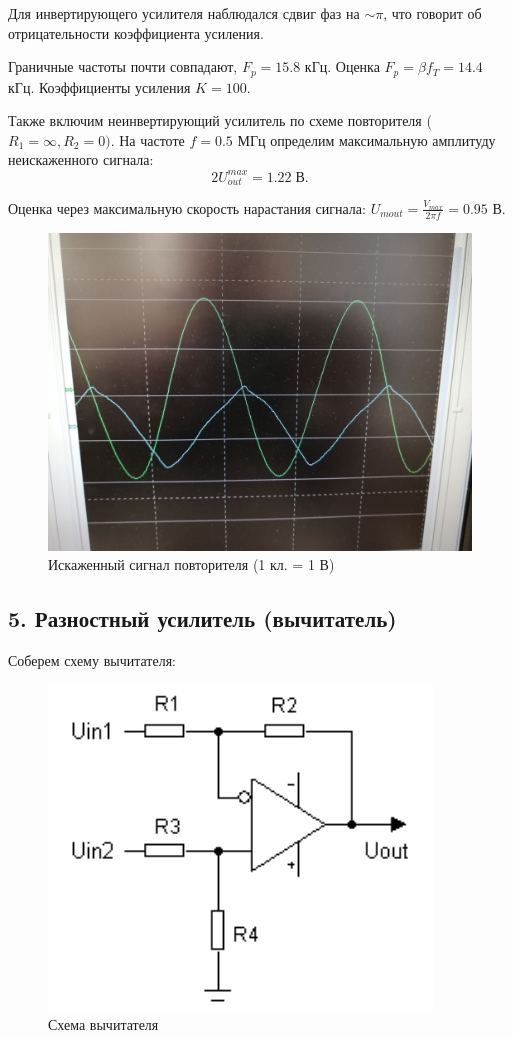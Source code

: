\documentclass[12pt,a4paper]{article}
\begin{document}
	Для инвертирующего усилителя наблюдался сдвиг фаз на $\sim \pi$, что говорит об отрицательности коэффициента усиления.
	
	Граничные частоты почти совпадают, $F_p = 15.8$ кГц. Оценка $F_p = \beta f_T = 14.4$ кГц.
	Коэффициенты усиления $K = 100$.
	
	Также включим неинвертирующий усилитель по схеме повторителя ($R_1 = \infty, R_2 = 0)$.
	На частоте $f = 0.5$ МГц определим максимальную амплитуду неискаженного сигнала:
	$$ 2 U_{out}^{max} = 1.22 \; \text{В}.$$
	
	Оценка через максимальную скорость нарастания сигнала: $U_{mout} = \frac{V_{max}}{2 \pi f} = 0.95$ В.
	
	\begin{figure}[H]
		\centering
		\includegraphics[width=0.5\linewidth]{res/repeat.jpg}
		\caption{Искаженный сигнал повторителя (1 кл. = 1 В)}
		\label{repeat}
	\end{figure}
	
	\subsection*{5. Разностный усилитель (вычитатель)}
	
	Соберем схему вычитателя:
	
	\begin{figure}[H]
		\centering
		\includegraphics[width=0.5\linewidth]{res/5.png}
		\caption{Схема вычитателя}
		\label{subtract}
	\end{figure}
	
\end{document}

